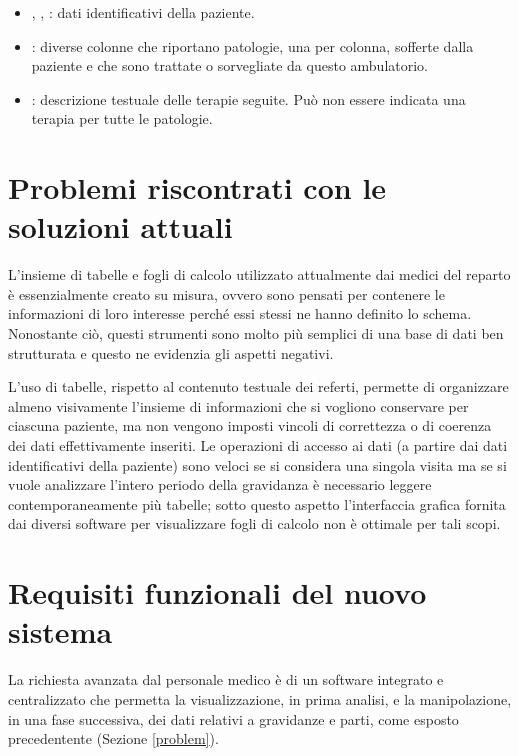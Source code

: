 \begin{itemize}
\item {}, , : dati identificativi della paziente.
\item {}: diverse colonne che riportano patologie, una per colonna, sofferte dalla paziente e che sono trattate o sorvegliate da questo ambulatorio.
\item {}: descrizione testuale delle terapie seguite. Può non essere indicata una terapia per tutte le patologie.
\end{itemize}

\section{Problemi riscontrati con le soluzioni attuali}

L'insieme di tabelle e fogli di calcolo utilizzato attualmente dai medici del reparto è essenzialmente creato su misura, ovvero sono pensati per contenere le informazioni di loro interesse perché essi stessi ne hanno definito lo schema.
Nonostante ciò, questi strumenti sono molto più semplici di una base di dati ben strutturata e questo ne evidenzia gli aspetti negativi.

L'uso di tabelle, rispetto al contenuto testuale dei referti, permette di organizzare almeno visivamente l'insieme di informazioni che si vogliono conservare per ciascuna paziente, ma non vengono imposti vincoli di correttezza o di coerenza dei dati effettivamente inseriti.
Le operazioni di accesso ai dati (a partire dai dati identificativi della paziente) sono veloci se si considera una singola visita ma se si vuole analizzare l'intero periodo della gravidanza è necessario leggere contemporaneamente più tabelle; sotto questo aspetto l'interfaccia grafica fornita dai diversi software per visualizzare fogli di calcolo non è ottimale per tali scopi.

\section{Requisiti funzionali del nuovo sistema}
\label{functionalrequirements}

La richiesta avanzata dal personale medico è di un software integrato e centralizzato che permetta la visualizzazione, in prima analisi, e la manipolazione, in una fase successiva, dei dati relativi a gravidanze e parti, come esposto precedentente (Sezione \ref{problem}).

